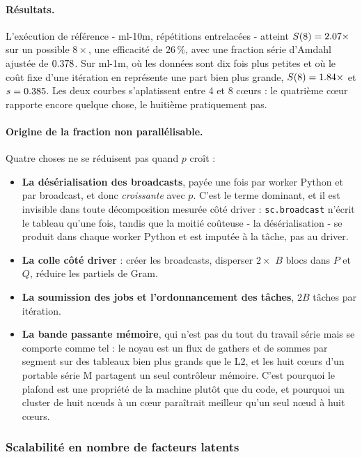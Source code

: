 \paragraph{Résultats.} L'exécution de référence - ml-10m, répétitions
entrelacées - atteint $S(8)=2.07\times$ sur un possible $8\times$, une
efficacité de $26\,\%$, avec une fraction série d'Amdahl ajustée de $0.378$. Sur
ml-1m, où les données sont dix fois plus petites et où le coût fixe d'une itération en
représente une part bien plus grande, $S(8)=1.84\times$ et $s=0.385$.
Les deux courbes s'aplatissent entre 4 et 8 cœurs : le quatrième cœur rapporte encore
quelque chose, le huitième pratiquement pas.

\paragraph{Origine de la fraction non parallélisable.} Quatre choses ne se réduisent pas quand $p$
croît :
\begin{itemize}\itemsep2pt
\item \textbf{La désérialisation des broadcasts}, payée une fois par worker Python et
par broadcast, et donc \emph{croissante} avec $p$. C'est le terme dominant, et il est
invisible dans toute décomposition mesurée côté driver : \texttt{sc.broadcast} n'écrit
le tableau qu'une fois, tandis que la moitié coûteuse - la désérialisation - se
produit dans chaque worker Python et est imputée à la tâche, pas au driver.
\item \textbf{La colle côté driver} : créer les broadcasts, disperser $2\times$ $B$
blocs dans $P$ et $Q$, réduire les partiels de Gram.
\item \textbf{La soumission des jobs et l'ordonnancement des tâches}, $2B$ tâches par
itération.
\item \textbf{La bande passante mémoire}, qui n'est pas du tout du travail série mais
se comporte comme tel : le noyau est un flux de gathers et de sommes par segment sur
des tableaux bien plus grands que le L2, et les huit cœurs d'un portable série M
partagent un seul contrôleur mémoire. C'est pourquoi le plafond est une propriété de
la machine plutôt que du code, et pourquoi un cluster de huit nœuds à un cœur
paraîtrait meilleur qu'un seul nœud à huit cœurs.
\end{itemize}

\subsubsection{Scalabilité en nombre de facteurs latents}\label{sec:factors}

